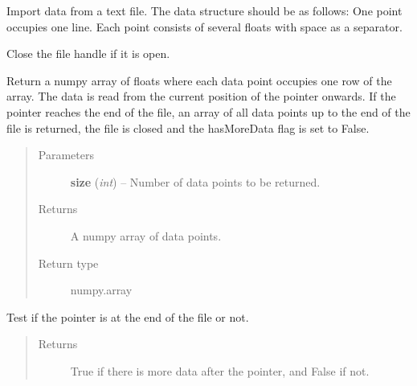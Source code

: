 \documentclass[letterpaper,10pt,english]{sphinxmanual}
\begin{document}
\begin{fulllineitems}
\label{common:common_data_importer.CommonFileDataImporter}
Import data from a text file. The data structure should be as follows:
One point occupies one line.
Each point consists of several floats with space as a separator.

\begin{fulllineitems}
\label{common:common_data_importer.CommonFileDataImporter.close_file}
Close the file handle if it is open.

\end{fulllineitems}


\begin{fulllineitems}
\label{common:common_data_importer.CommonFileDataImporter.get_data}
Return a numpy array of floats where each data point occupies one row of the array. The data is read from
the current position of the pointer onwards. If the pointer reaches the end of the file, an array of all data
points up to the end of the file is returned, the file is closed and the hasMoreData flag is set to False.
\begin{quote}\begin{description}
\item[{Parameters}] \leavevmode
\textbf{size} (\emph{int}) -- Number of data points to be returned.

\item[{Returns}] \leavevmode
A numpy array of data points.

\item[{Return type}] \leavevmode
numpy.array

\end{description}\end{quote}

\end{fulllineitems}


\begin{fulllineitems}
\label{common:common_data_importer.CommonFileDataImporter.has_more_data}
Test if the pointer is at the end of the file or not.
\begin{quote}\begin{description}
\item[{Returns}] \leavevmode
True if there is more data after the pointer, and False if not.


\end{description}
\end{quote}
\end{fulllineitems}
\end{fulllineitems}
\end{document}
